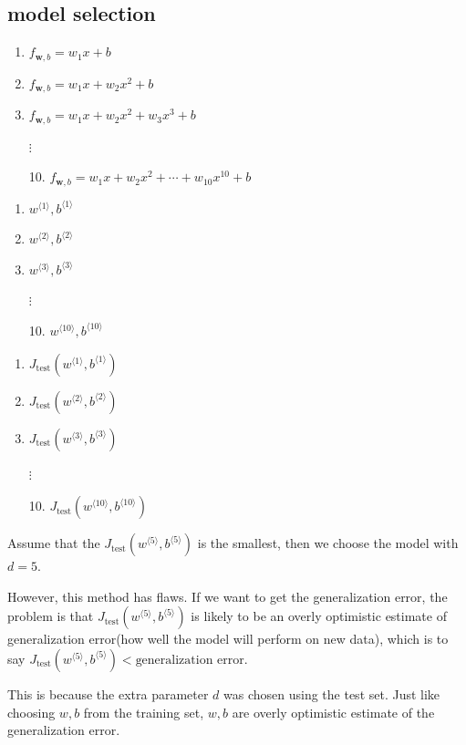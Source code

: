 \subsection*{model selection}
\begin{minipage}{0.51\textwidth}
\begin{enumerate}
    \item $f_{\mathbf{w}, b} = w_1x + b$
    \item $f_{\mathbf{w}, b} = w_1x + w_2x^2 + b$
    \item $f_{\mathbf{w}, b} = w_1x + w_2x^2 + w_3x^3 + b$
    \item[] \hspace{3em}$\vdots$
    \item[10.] $f_{\mathbf{w}, b} = w_1x + w_2x^2 + \cdots + w_{10}x^{10} + b$
\end{enumerate}
\end{minipage}
\vrule{}
\begin{minipage}{0.2\textwidth}
\begin{enumerate}
    \item $w^{\langle1\rangle}, b^{\langle1\rangle}$
    \item $w^{\langle2\rangle}, b^{\langle2\rangle}$
    \item $w^{\langle3\rangle}, b^{\langle3\rangle}$
    \item[] \hspace{1em}$\vdots$
    \item[10.] $w^{\langle10\rangle}, b^{\langle10\rangle}$
\end{enumerate}
\end{minipage}
\vrule{}
\begin{minipage}{0.25\textwidth}
\begin{enumerate}
    \item $J_{\text{test}}(w^{\langle1\rangle}, b^{\langle1\rangle})$
    \item $J_{\text{test}}(w^{\langle2\rangle}, b^{\langle2\rangle})$
    \item $J_{\text{test}}(w^{\langle3\rangle}, b^{\langle3\rangle})$
    \item[] \hspace{1em}$\vdots$
    \item[10.] $J_{\text{test}}(w^{\langle10\rangle}, b^{\langle10\rangle})$
\end{enumerate}
\end{minipage}
\par
Assume that the $J_{\text{test}}(w^{\langle5\rangle}, b^{\langle5\rangle})$ is the smallest, then we choose the model
with $d = 5$.\par
However, this method has flaws. If we want to get the generalization error, the problem is that 
$J_{\text{test}}(w^{\langle5\rangle}, b^{\langle5\rangle})$ is likely to be an overly optimistic estimate of 
generalization error(how well the model will perform on new data), which is to say $J_{\text{test}}(w^{\langle5\rangle}, b^{\langle5\rangle})< \text{generalization error}$.
\par
This is because the extra parameter $d$ was chosen using the test set. Just like choosing $w, b$ from the training set,
$w, b$ are overly optimistic estimate of the generalization error.
\newpage
